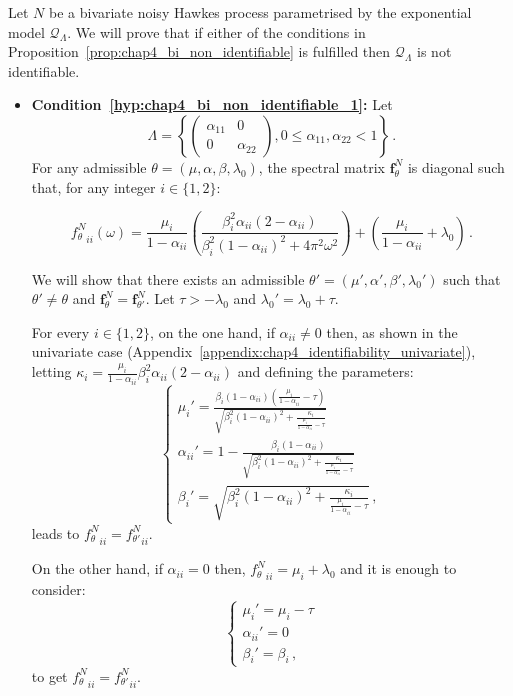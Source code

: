 \begin{subappendices}
Let $N$ be a bivariate noisy Hawkes process parametrised by the exponential model $\mathcal{Q}_\Lambda$. We will prove that if either of the conditions in Proposition~\ref{prop:chap4_bi_non_identifiable} is fulfilled then $\mathcal{Q}_\Lambda$ is not identifiable.

\begin{itemize}

\item \textbf{Condition~\ref{hyp:chap4_bi_non_identifiable_1}:} Let 
\[\Lambda = \left\{ \begin{pmatrix} \alpha_{11} & 0 \\ 0 & \alpha_{22} \end{pmatrix}, 0 \le \alpha_{11}, \alpha_{22} < 1 \right\}\,.\]
For any admissible $\theta = (\mu, \alpha, \beta, \lambda_0)$, the spectral matrix $\mathbf{f}_{\theta}^N$ is diagonal such that, for any integer $i\in\{1,2\}$:

\[{ f_{\theta}^N }_{ii}(\omega) = \frac{\mu_i}{1-\alpha_{ii}}\left(\frac{\beta_i^2 \alpha_{ii} (2-\alpha_{ii})}{\beta_i^2 (1-\alpha_{ii})^2 + 4 \pi^2 \omega^2} \right) + \left(\frac{\mu_i}{1-\alpha_{ii}} + \lambda_0\right)\,.\] 

We will show that there exists an admissible $\theta' = (\mu', \alpha', \beta', \lambda_0')$ such that $\theta'\neq \theta$ and $\mathbf{f}_\theta^N = \mathbf{f}_{\theta'}^N$. Let $\tau > -\lambda_0$ and $\lambda_0' = \lambda_0 + \tau$.

For every $i\in\{1,2\}$,
on the one hand, if $\alpha_{ii}\neq 0$ then, as shown in the univariate case (Appendix~\ref{appendix:chap4_identifiability_univariate}),
letting $\kappa_i = \frac{\mu_i}{1-\alpha_{ii}}\beta_i^2 \alpha_{ii} (2-\alpha_{ii})$ and defining the parameters:
\begin{equation}
\begin{cases}
\mu_i' = \frac{\beta_i(1-\alpha_{ii}) (\frac{\mu_i}{1-\alpha_{ii}}-\tau)}{\sqrt{\beta_i^2(1-\alpha_{ii})^2 + \frac{\kappa_i}{\frac{\mu_i}{1-\alpha_{ii}}-\tau}}} \\
\alpha_{ii}' = 1 - \frac{\beta_i(1 - \alpha_{ii})}{\sqrt{\beta_i^2(1-\alpha_{ii})^2 + \frac{\kappa_i}{\frac{\mu_i}{1-\alpha_{ii}}-\tau}}} \\
\beta_i' = \sqrt{\beta_i^2(1-\alpha_{ii})^2 + \frac{\kappa_i}{\frac{\mu_i}{1-\alpha_{ii}}-\tau}}\,,
\end{cases}
\end{equation}
leads to ${ f_{\theta}^N }_{ii} = { f_{\theta'}^N }_{ii}$.

On the other hand, if $\alpha_{ii}=0$ then,
${ f_{\theta}^N }_{ii} = \mu_i + \lambda_0$ and it is enough to consider:
\[
\begin{cases}
\mu_i' = \mu_i - \tau \\
\alpha_{ii}' = 0 \\
\beta_i' = \beta_i\,,
\end{cases}
\]
to get ${ f_{\theta}^N }_{ii} = { f_{\theta'}^N }_{ii}$.


\end{itemize}
\end{subappendices}
